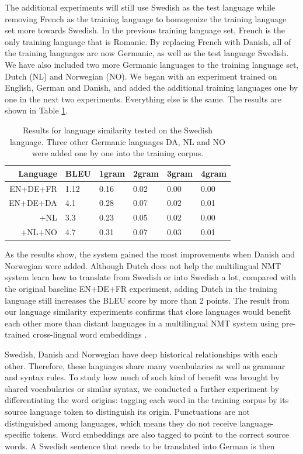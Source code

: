 \documentclass[thesis]{cluu}
\begin{document}
The additional experiments will still use Swedish as the test language while removing French as the training language to homogenize the training language set more towards Swedish. In the previous training language set, French is the only training language that is Romanic. By replacing French with Danish, all of the training languages are now Germanic, as well as the test language Swedish. We have also included two more Germanic languages to the training language set, Dutch (NL) and Norwegian (NO). We began with an experiment trained on English, German and Danish, and added the additional training languages one by one in the next two experiments. Everything else is the same. The results are shown in Table \ref{table:language_similarity}.

\begin{table}
  \centering
  \begin{tabular}{r|*{5}{l}}
    \hline
    \textbf{Language} & \textbf{BLEU} & \textbf{1gram} & \textbf{2gram} & \textbf{3gram} & \textbf{4gram} \\ [0.25ex]
    \hline\hline
    EN+DE+FR & 1.12 & 0.16 & 0.02 & 0.00 & 0.00 \\
    \hline
    EN+DE+DA & 4.1 & 0.28 & 0.07 & 0.02 & 0.01 \\
    +NL & 3.3 & 0.23 & 0.05 & 0.02 & 0.00 \\ 
    +NL+NO & 4.7 & 0.31 & 0.07 & 0.03 & 0.01 \\
    \hline
  \end{tabular}
  \caption{Results for language similarity tested on the Swedish language. Three other Germanic languages DA, NL and NO were added one by one into the training corpus.}
  \label{table:language_similarity}
\end{table}

As the results show, the system gained the most improvements when Danish and Norwegian were added. Although Dutch does not help the multilingual NMT system learn how to translate from Swedish or into Swedish a lot, compared with the original baseline EN+DE+FR experiment, adding Dutch in the training language still increases the BLEU score by more than 2 points. The result from our language similarity experiments confirms that close languages would benefit each other more than distant languages in a multilingual NMT system using pre-trained cross-lingual word embeddings \parencite{Qi:2018aa}.

Swedish, Danish and Norwegian have deep historical relationships with each other. Therefore, these languages share many vocabularies as well as grammar and syntax rules. To study how much of such kind of benefit was brought by shared vocabularies or similar syntax, we conducted a further experiment by differentiating the word origins: tagging each word in the training corpus by its source language token to distinguish its origin. Punctuations are not distinguished among languages, which means they do not receive language-specific tokens. Word embeddings are also tagged to point to the correct source words. A Swedish sentence that needs to be translated into German is then
\end{document}
